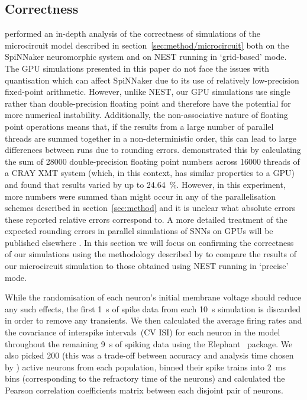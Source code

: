 \documentclass[utf8]{frontiersSCNS} %
\begin{document}
\subsection{Correctness}
\label{sec:results/correctness}
\citet{VanAlbada2018} performed an in-depth analysis of the correctness of simulations of the microcircuit model described in section~\ref{sec:method/microcircuit} \citep{Potjans2012}  both on the SpiNNaker neuromorphic system and on NEST running in `grid-based' mode.
The GPU simulations presented in this paper do not face the issues with quantisation which can affect SpiNNaker due to its use of relatively low-precision fixed-point arithmetic.
However, unlike NEST, our GPU simulations use single rather than double-precision floating point and therefore have the potential for more numerical instability.
Additionally, the non-associative nature of floating point operations means that, if the results from a large number of parallel threads are summed together in a non-deterministic order, this can lead to large differences between runs due to rounding errors.
\citet{Villa2009} demonstrated this by calculating the sum of \num{28000} double-precision floating point numbers across \num{16000} threads of a CRAY XMT system (which, in this context, has similar properties to a GPU) and found that results varied by up to \SI{24.64}{\percent}.
However, in this experiment, more numbers were summed than might occur in any of the parallelisation schemes described in section~\ref{sec:method} and it is unclear what absolute errors these reported relative errors correspond to. A more detailed treatment of the expected rounding errors in parallel simulations of SNNs on GPUs will be published elsewhere \citep{Turner2019}. In this section we will focus on confirming the correctness of our simulations using the methodology described by \citet{VanAlbada2018} to compare the results of our microcircuit simulation to those obtained using NEST running in `precise' mode.

While the randomisation of each neuron's initial membrane voltage should reduce any such effects, the first \SI{1}{\second} of spike data from each \SI{10}{\second} simulation is discarded in order to remove any transients.
We then calculated the average firing rates and the covariance of interspike intervals~(CV ISI) for each neuron in the model throughout the remaining \SI{9}{\second} of spiking data using the Elephant~\citep{Yegenoglu2018} package.
We also picked \num{200} (this was a trade-off between accuracy and analysis time chosen by \citeauthor{VanAlbada2018}) active neurons from each population, binned their spike trains into \SI{2}{\milli\second} bins (corresponding to the refractory time of the neurons) and calculated the Pearson correlation coefficients matrix between each disjoint pair of neurons.
\end{document}
